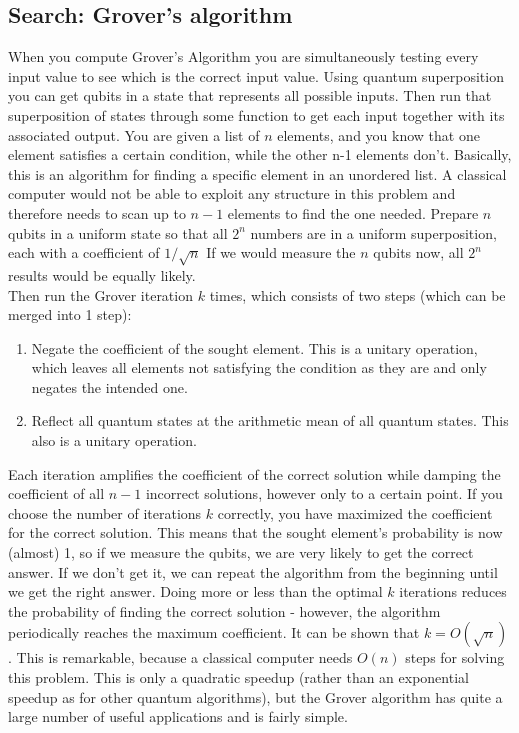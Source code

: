 \subsection{Search: Grover's algorithm}
When you compute Grover's Algorithm you are simultaneously testing every input value to see which is the correct input value. Using quantum superposition you can get qubits in a state that represents all possible inputs. Then run that superposition of states through some function to get each input together with its associated output. You are given a list of $n$ elements, and you know that one element satisfies a certain condition, while the other n-1 elements don't. Basically, this is an algorithm for finding a specific element in an unordered list. A classical computer would not be able to exploit any structure in this problem and therefore needs to scan up to $n-1$ elements to find the one needed.
Prepare $n$ qubits in a uniform state so that all $2^n$ numbers are in a uniform superposition, each with a coefficient of $1/\sqrt{n}$ If we would measure the $n$ qubits now, all $2^n$ results would be equally likely.\\
Then run the Grover iteration $k$ times, which consists of two steps (which can be merged into 1 step):
\begin{enumerate}
\item Negate the coefficient of the sought element. This is a unitary operation, which leaves all elements not satisfying the condition as they are and only negates the intended one.
\item Reflect all quantum states at the arithmetic mean of all quantum states. This also is a unitary operation.
\end{enumerate}
Each iteration amplifies the coefficient of the correct solution while damping the coefficient of all $n-1$ incorrect solutions, however only to a certain point.
If you choose the number of iterations $k$ correctly, you have maximized the coefficient for the correct solution. This means that the sought element's probability is now (almost) 1, so if we measure the qubits, we are very likely to get the correct answer. If we don't get it, we can repeat the algorithm from the beginning until we get the right answer. Doing more or less than the optimal $k$ iterations reduces the probability of finding the correct solution - however, the algorithm periodically reaches the maximum coefficient.
It can be shown that $k=O(\sqrt{n})$. This is remarkable, because a classical computer needs $O(n)$ steps for solving this problem. This is only a quadratic speedup (rather than an exponential speedup as for other quantum algorithms), but the Grover algorithm has quite a large number of useful applications and is fairly simple.

